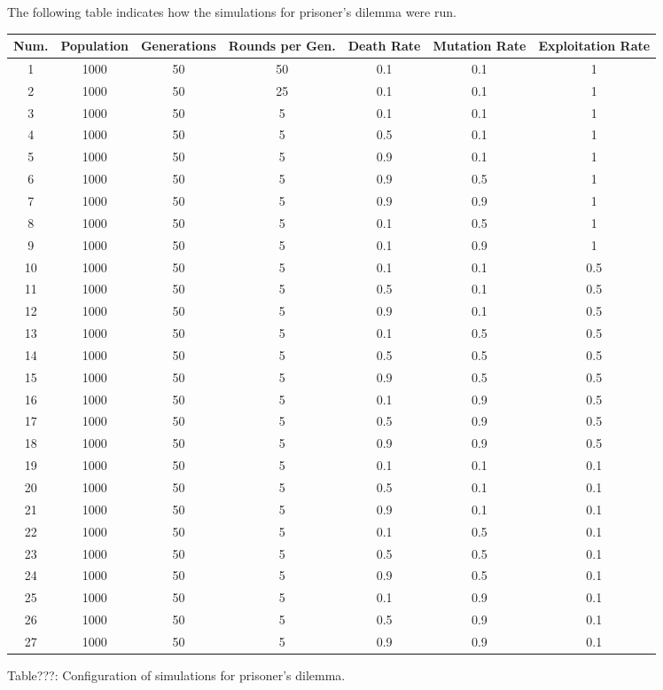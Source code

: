 \documentclass{article}
\begin{document}
The following table indicates how the simulations for prisoner's dilemma were run.
\begin{center}
\begin{tabular}{|c|c|c|c|c|c|c|}
\hline
Num. & Population & Generations& Rounds per Gen. & Death Rate & Mutation Rate & Exploitation Rate\\ 
\hline
1& 1000 & 50 & 50 & 0.1 & 0.1 & 1\\
\hline
2& 1000 & 50 & 25 & 0.1 & 0.1 & 1\\
\hline
3& 1000 & 50 & 5 & 0.1 & 0.1 & 1\\
\hline
4& 1000 & 50 & 5 & 0.5 & 0.1 & 1\\
\hline
5& 1000 & 50 & 5 & 0.9 & 0.1 & 1\\
\hline
6& 1000 & 50 & 5 & 0.9 & 0.5 & 1\\
\hline
7& 1000 & 50 & 5 & 0.9 & 0.9 & 1\\
\hline
8& 1000 & 50 & 5 & 0.1 & 0.5 & 1\\
\hline
9& 1000 & 50 & 5 & 0.1 & 0.9 & 1\\
\hline
10& 1000 & 50 & 5 & 0.1 & 0.1 & 0.5\\
\hline
11& 1000 & 50 & 5 & 0.5 & 0.1 & 0.5\\
\hline
12& 1000 & 50 & 5 & 0.9 & 0.1 & 0.5\\
\hline
13& 1000 & 50 & 5 & 0.1 & 0.5 & 0.5\\
\hline
14& 1000 & 50 & 5 & 0.5 & 0.5 & 0.5\\
\hline
15& 1000 & 50 & 5 & 0.9 & 0.5 & 0.5\\
\hline
16& 1000 & 50 & 5 & 0.1 & 0.9 & 0.5\\
\hline
17& 1000 & 50 & 5 & 0.5 & 0.9 & 0.5\\
\hline
18& 1000 & 50 & 5 & 0.9 & 0.9 & 0.5\\
\hline
19& 1000 & 50 & 5 & 0.1 & 0.1 & 0.1\\
\hline
20& 1000 & 50 & 5 & 0.5 & 0.1 & 0.1\\
\hline
21& 1000 & 50 & 5 & 0.9 & 0.1 & 0.1\\
\hline
22& 1000 & 50 & 5 & 0.1 & 0.5 & 0.1\\
\hline
23& 1000 & 50 & 5 & 0.5 & 0.5 & 0.1\\
\hline
24& 1000 & 50 & 5 & 0.9 & 0.5 & 0.1\\
\hline
25& 1000 & 50 & 5 & 0.1 & 0.9& 0.1\\
\hline
26& 1000 & 50 & 5 & 0.5 & 0.9 & 0.1\\
\hline
27& 1000 & 50 & 5 & 0.9 & 0.9 & 0.1\\
\hline
\end{tabular}
\end{center}
\begin{center}
Table???: Configuration of simulations for prisoner's dilemma.
\end{center}
\end{document}
